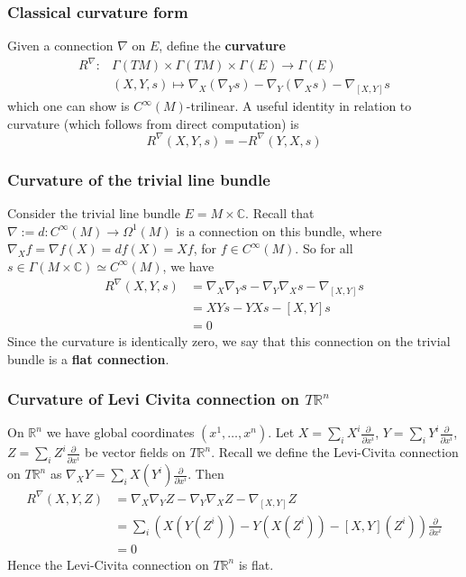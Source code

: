 \documentclass[a4paper]{article}
\theoremstyle{definition} \newtheorem*{definition}{Definition}
\theoremstyle{definition} \newtheorem*{definitions}{Definitions}
\theoremstyle{plain} \newtheorem{theorem}{Theorem}[section]
\theoremstyle{plain} \newtheorem{proposition}[theorem]{Proposition}
\theoremstyle{plain} \newtheorem{corollary}[theorem]{Corollary}
\theoremstyle{plain} \newtheorem{lemma}[theorem]{Lemma}
\theoremstyle{plain} \newtheorem{example}[theorem]{Example}
\newcommand{\defn}[1]{\textbf{#1}}
\newcommand{\realnos}{\mathbb{R}}
\newcommand{\complexnos}{\mathbb{C}}
\newcommand{\smooth}{C^\infty}
\begin{document}
\subsubsection{Classical curvature form}
Given a connection $\nabla$ on $E$, define the \defn{curvature}
\begin{align*}
R^\nabla : & \Gamma(TM)\times \Gamma(TM)\times \Gamma(E)\to \Gamma(E) \\
& (X, Y, s) \mapsto \nabla_X(\nabla_Y s) - \nabla_Y(\nabla_X s) - \nabla_{[X, Y]} s
\end{align*}
which one can show is $\smooth (M)$-trilinear.
A useful identity in relation to curvature (which follows from direct computation) is
$$R^\nabla (X, Y, s)=-R^\nabla (Y, X, s)$$

\subsubsection{Curvature of the trivial line bundle}
Consider the trivial line bundle $E=M\times \complexnos$. Recall that $\nabla:=d:\smooth(M)\to \Omega^1(M)$ is a connection on this bundle, where $\nabla_X f = \nabla f(X) = df(X) = Xf$, for $f\in \smooth(M)$. 
So for all $s\in \Gamma(M\times \complexnos)\simeq \smooth(M)$, we have
\begin{align*}
    R^\nabla(X, Y, s) & = \nabla_X \nabla_Y s - \nabla_Y \nabla_X s - \nabla_{[X, Y]}s \\
    & = XYs - YXs - [X, Y]s \\
    & = 0
\end{align*}
Since the curvature is identically zero, we say that this connection on the trivial bundle is a \defn{flat connection}.

\subsubsection{Curvature of Levi Civita connection on $T\realnos^n$}
On $\realnos^n$ we have global coordinates $(x^1, \ldots, x^n)$. 
Let
$X=\sum_i X^i \frac{\partial}{\partial x^i}$, $Y=\sum_i Y^i \frac{\partial}{\partial x^i}$, $Z=\sum_i Z^i \frac{\partial}{\partial x^i}$ be vector fields on $T\realnos^n$. 
Recall we define the Levi-Civita connection on $T\realnos^n$ as
$\nabla_X Y = \sum_i X(Y^i) \frac{\partial}{\partial x^i}$. Then 
\begin{align*}
      R^\nabla(X, Y, Z) & = \nabla_X \nabla_Y Z - \nabla_Y \nabla_X Z - \nabla_{[X, Y]} Z \\
      & = \sum_i (X(Y(Z^i))-Y(X(Z^i))-[X, Y](Z^i))\frac{\partial}{\partial x^i} \\
      & = 0
\end{align*}
Hence the Levi-Civita connection on $T\realnos^n$ is flat. 
\end{document}
